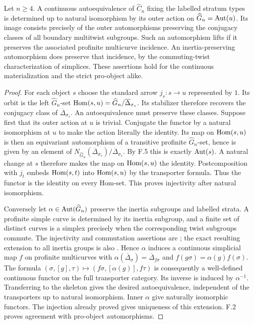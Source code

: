 Let $n\geq4$. A continuous autoequivalence of $\widehat C_n$ fixing the labelled stratum types is determined up to natural isomorphism by its outer action on $\widehat G_n=\operatorname{Aut}(u)$. Its image consists precisely of the outer automorphisms preserving the conjugacy classes of all boundary multitwist subgroups. Such an automorphism lifts if it preserves the associated profinite multicurve incidence. An inertia-preserving automorphism does preserve that incidence, by the commuting-twist characterization of simplices. These assertions hold for the continuous materialization and the strict pro-object alike.
\begin{proof}
For each object $s$ choose the standard arrow $j_s:s\to u$ represented by $1$. Its orbit is the left $\widehat G_n$-set
$\operatorname{Hom}(s,u)=\widehat G_n/\overline\Delta_{\sigma_s}$.
Its stabilizer therefore recovers the conjugacy class of $\overline\Delta_{\sigma_s}$. An autoequivalence must preserve these classes. Suppose first that its outer action at $u$ is trivial. Conjugate the functor by a natural isomorphism at $u$ to make the action literally the identity. Its map on $\operatorname{Hom}(s,u)$ is then an equivariant automorphism of a transitive profinite $\widehat G_n$-set, hence is given by an element of
$N_{\widehat G_n}(\overline\Delta_{\sigma_s})/\overline\Delta_{\sigma_s}$.
By F.5 this is exactly $\operatorname{Aut}(s)$. A natural change at $s$ therefore makes the map on $\operatorname{Hom}(s,u)$ the identity. Postcomposition with $j_t$ embeds $\operatorname{Hom}(s,t)$ into $\operatorname{Hom}(s,u)$ by the transporter formula. Thus the functor is the identity on every Hom-set. This proves injectivity after natural isomorphism.

Conversely let $\alpha\in\operatorname{Aut}(\widehat G_n)$ preserve the inertia subgroups and labelled strata. A profinite simple curve is determined by its inertia subgroup, and a finite set of distinct curves is a simplex precisely when the corresponding twist subgroups commute. The injectivity and commutation assertions are \citet[Theorem 4.11, Corollary 4.12, and Proposition 7.2]{AF_BoggiFunar2023}; the exact resulting extension to all inertia groups is also \citet[Proposition 3.5]{Boggi2026Automorphisms}. Hence $\alpha$ induces a continuous simplicial map $f$ on profinite multicurves with
$\alpha(\overline\Delta_\sigma)=\overline\Delta_{f\sigma}$ and
$f(g\sigma)=\alpha(g)f(\sigma)$.
The formula $(\sigma,[g],\tau)\mapsto(f\sigma,[\alpha(g)],f\tau)$ is consequently a well-defined continuous functor on the full transporter category. Its inverse is induced by $\alpha^{-1}$. Transferring to the skeleton gives the desired autoequivalence, independent of the transporters up to natural isomorphism. Inner $\alpha$ give naturally isomorphic functors. The injection already proved gives uniqueness of this extension. F.2 proves agreement with pro-object automorphisms.
\end{proof}

